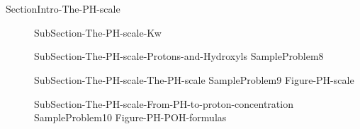 \documentclass[main.tex]{subfiles}
\newcommand\chapterlabel{Ch-acidbase}\setcounter{figurenewcounter}{0}\setcounter{tablenewcounter}{0}\setcounter{formulanewcounter}{0}
\begin{document}
\section{\color{blue!30!black}{The PH scale}}{SectionIntro-The-PH-scale}
\sloppy\begin{description}
\item[] {SubSection-The-PH-scale-Kw}
\item[] {SubSection-The-PH-scale-Protons-and-Hydroxyls}
{SampleProblem8}
\item[] {SubSection-The-PH-scale-The-PH-scale}
{SampleProblem9}
{Figure-PH-scale}
\item[] {SubSection-The-PH-scale-From-PH-to-proton-concentration}
{SampleProblem10}
{Figure-PH-POH-formulas}
\end{description}

\end{document}
